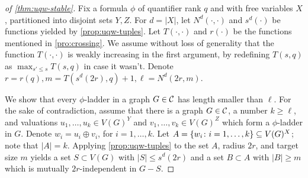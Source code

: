 \begin{proof}[of \cref{thm:uqw-stable}]
Fix a formula $\phi$ of quantifier rank $q$ and with free variables $X$, partitioned into disjoint sets $Y,Z$.
For $d=|X|$,
let $N^d(\cdot,\cdot)$ and $s^d(\cdot)$ be functions yielded by \cref{prop:uqw-tuples}.
Let $T(\cdot,\cdot)$ and $r(\cdot)$ be the functions mentioned in \cref{pro:crossing}.
We assume without loss of generality that the function $T(\cdot,\cdot)$ is weakly increasing in the first argument, by redefining $T(s,q)$ as $\max_{s'\le s} T(s,q)$ in case it wasn't.
Denote $r=r(q), m=T(s^d(2r),q)+1, \ell=N^d(2r,m)$.

We show that 
every $\phi$-ladder in a graph $G\in\cal C$ has length smaller than $\ell$. 
For the sake of contradiction, assume that there is a graph $G\in\cal C$, a number $k\ge \ell$,
and valuations $u_1,\ldots,u_k\in V(G)^Y$ and $ v_1,\ldots, v_k\in V(G)^Z$
which form a $\phi$-ladder in $G$.
Denote $w_i=u_i\oplus v_i$, for $i=1,\ldots,k$.
	Let $A=\set{ w_i\colon i=1,\ldots,k}\subset V(G)^X$; note that $|A|=k$.
Applying \cref{prop:uqw-tuples} to the set $A$, radius $2r$, and target size $m$
		 yields a set $S\subset V(G)$ with $|S|\le s^d(2r)$
	and a set $B\subset A$ with $|B|\geq m$ which is mutually $2r$-independent in $G-S$.
%
%
%

\end{proof}
